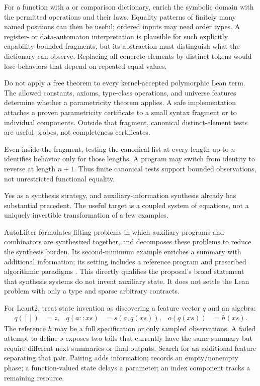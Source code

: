 For a function with a  or comparison dictionary, enrich the symbolic domain with the permitted operations and their laws. Equality patterns of finitely many named positions can then be useful; ordered inputs may need order types. A register- or data-automaton interpretation is plausible for such explicitly capability-bounded fragments, but its abstraction must distinguish what the dictionary can observe. Replacing all concrete elements by distinct tokens would lose behaviors that depend on repeated equal values.

Do not apply a free theorem to every kernel-accepted polymorphic Lean term. The allowed constants, axioms, type-class operations, and universe features determine whether a parametricity theorem applies. A safe implementation attaches a proven parametricity certificate to a small syntax fragment or to individual components. Outside that fragment, canonical distinct-element tests are useful probes, not completeness certificates.

Even inside the fragment, testing the canonical list at every length up to $n$ identifies behavior only for those lengths. A program may switch from identity to reverse at length $n+1$. Thus finite canonical tests support bounded observations, not unrestricted functional equality.

\ans Yes as a synthesis strategy, and auxiliary-information synthesis already has substantial precedent. The useful target is a coupled system of equations, not a uniquely invertible transformation of a few examples.

AutoLifter formulates lifting problems in which auxiliary programs and combinators are synthesized together, and decomposes these problems to reduce the synthesis burden. Its second-minimum example enriches a summary with additional information; its setting includes a reference program and prescribed algorithmic paradigms \cite{autolifter}. This directly qualifies the proposal's broad statement that synthesis systems do not invent auxiliary state. It does not settle the Lean problem with only a type and sparse arbitrary contracts.

For Leant2, treat state invention as discovering a feature vector $q$ and an algebra:
\begin{align*}
 q([])&=z,&q(a::xs)&=s(a,q(xs)),&o(q(xs))&=h(xs).
\end{align*}
The reference $h$ may be a full specification or only sampled observations. A failed attempt to define $s$ exposes two tails that currently have the same summary but require different next summaries or final outputs. Search for an additional feature separating that pair. Pairing adds information;  records an empty/nonempty phase; a function-valued state delays a parameter; an index component tracks a remaining resource.

